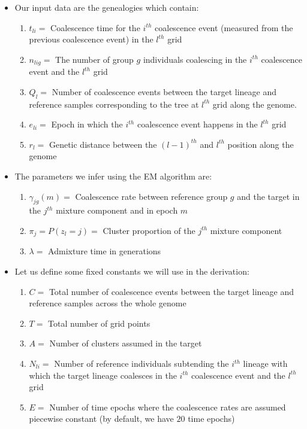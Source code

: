 \begin{itemize}    
    \item Our input data are the genealogies which contain:
    \begin{enumerate}
        \item $t_{li} =$ Coalescence time for the $i^{th}$ coalescence event (measured from the previous coalescence event) in the $l^{th}$ grid
        \item $n_{lig} =$ The number of group $g$ individuals coalescing in the $i^{th}$ coalescence event and the $l^{th}$ grid
        \item $Q_l =$ Number of coalescence events between the target lineage and reference samples corresponding to the tree at $l^{th}$ grid along the genome.
        \item $e_{li} =$ Epoch in which the $i^{th}$ coalescence event happens in the $l^{th}$ grid
        \item $r_{l} =$ Genetic distance between the $(l-1)^{th}$ and $l^{th}$ position along the genome
    \end{enumerate}

    \item The parameters we infer using the EM algorithm are:
    \begin{enumerate}
        \item $\gamma_{jg}(m) =$ Coalescence rate between reference group $g$ and the target in the $j^{th}$ mixture component and in epoch $m$
        \item $\pi_j = P(z_l = j) =$ Cluster proportion of the $j^{th}$ mixture component
        \item $\lambda =$ Admixture time in generations
    \end{enumerate}

    \item Let us define some fixed constants we will use in the derivation:
    \begin{enumerate}
        \item $C =$ Total number of coalescence events between the target lineage and reference samples across the whole genome
        \item $T =$ Total number of grid points
        \item $A =$ Number of clusters assumed in the target
        \item $N_{li} =$ Number of reference individuals subtending the $i^{th}$ lineage with which the target lineage coalesces in the $i^{th}$ coalescence event and the $l^{th}$ grid
        \item $E =$ Number of time epochs where the coalescence rates are assumed piecewise constant (by default, we have $20$ time epochs)
    \end{enumerate}


\end{itemize}
